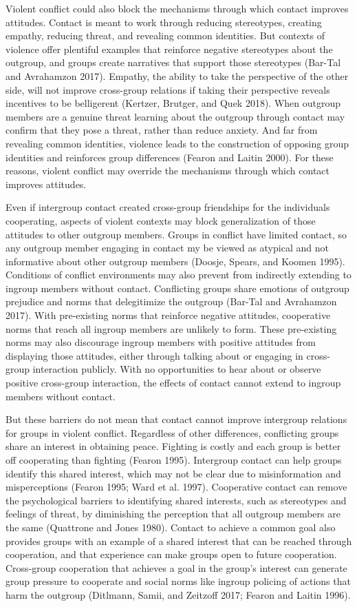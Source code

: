 \documentclass[11pt]{article}
\begin{document}
Violent conflict could also block the mechanisms through which contact
improves attitudes. Contact is meant to work through reducing
stereotypes, creating empathy, reducing threat, and revealing common
identities. But contexts of violence offer plentiful examples that
reinforce negative stereotypes about the outgroup, and groups create
narratives that support those stereotypes (Bar-Tal and Avrahamzon 2017).
Empathy, the ability to take the perspective of the other side, will not
improve cross-group relations if taking their perspective reveals
incentives to be belligerent (Kertzer, Brutger, and Quek 2018). When
outgroup members are a genuine threat learning about the outgroup
through contact may confirm that they pose a threat, rather than reduce
anxiety. And far from revealing common identities, violence leads to the
construction of opposing group identities and reinforces group
differences (Fearon and Laitin 2000). For these reasons, violent
conflict may override the mechanisms through which contact improves
attitudes.

Even if intergroup contact created cross-group friendships for the
individuals cooperating, aspects of violent contexts may block
generalization of those attitudes to other outgroup members. Groups in
conflict have limited contact, so any outgroup member engaging in
contact my be viewed as atypical and not informative about other
outgroup members (Doosje, Spears, and Koomen 1995). Conditions of
conflict environments may also prevent from indirectly extending to
ingroup members without contact. Conflicting groups share emotions of
outgroup prejudice and norms that delegitimize the outgroup (Bar-Tal and
Avrahamzon 2017). With pre-existing norms that reinforce negative
attitudes, cooperative norms that reach all ingroup members are unlikely
to form. These pre-existing norms may also discourage ingroup members
with positive attitudes from displaying those attitudes, either through
talking about or engaging in cross-group interaction publicly. With no
opportunities to hear about or observe positive cross-group interaction,
the effects of contact cannot extend to ingroup members without contact.

But these barriers do not mean that contact cannot improve intergroup
relations for groups in violent conflict. Regardless of other
differences, conflicting groups share an interest in obtaining peace.
Fighting is costly and each group is better off cooperating than
fighting (Fearon 1995). Intergroup contact can help groups identify this
shared interest, which may not be clear due to misinformation and
misperceptions (Fearon 1995; Ward et al. 1997). Cooperative contact can
remove the psychological barriers to identifying shared interests, such
as stereotypes and feelings of threat, by diminishing the perception
that all outgroup members are the same (Quattrone and Jones 1980).
Contact to achieve a common goal also provides groups with an example of
a shared interest that can be reached through cooperation, and that
experience can make groups open to future cooperation. Cross-group
cooperation that achieves a goal in the group's interest can generate
group pressure to cooperate and social norms like ingroup policing of
actions that harm the outgroup (Ditlmann, Samii, and Zeitzoff 2017;
Fearon and Laitin 1996).
\end{document}
